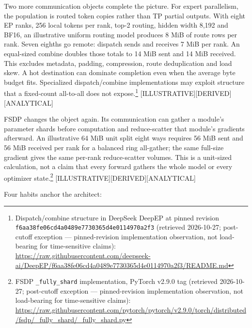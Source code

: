 Two more communication objects complete the picture. For expert
parallelism, the population is routed token copies rather than TP
partial outputs. With eight EP ranks, 256 local tokens per rank, top-2
routing, hidden width 8,192 and BF16, an illustrative uniform routing
model produces 8 MiB of route rows per rank. Seven eighths go remote:
dispatch sends and receives 7 MiB per rank. An equal-sized combine
doubles those totals to 14 MiB sent and 14 MiB received. This excludes
metadata, padding, compression, route deduplication and load skew. A hot
destination can dominate completion even when the average byte budget
fits. Specialized dispatch/combine implementations may exploit structure
that a fixed-count all-to-all does not expose.\footnote{Dispatch/combine
  structure in DeepSeek DeepEP at pinned revision
  \texttt{f6aa38fe06cd4a0489e7730365d4e0114970a2f3} (retrieved
  2026-10-27; post-cutoff exception --- pinned-revision implementation
  observation, not load-bearing for time-sensitive claims):
  \url{https://raw.githubusercontent.com/deepseek-ai/DeepEP/f6aa38fe06cd4a0489e7730365d4e0114970a2f3/README.md}}
\mbox{{[}ILLUSTRATIVE{]}}\hspace{0pt}\mbox{{[}DERIVED{]}}\hspace{0pt}\mbox{{[}ANALYTICAL{]}}

FSDP changes the object again. Its communication can gather a module's
parameter shards before computation and reduce-scatter that module's
gradients afterward. An illustrative 64 MiB unit split eight ways
requires 56 MiB sent and 56 MiB received per rank for a balanced ring
all-gather; the same full-size gradient gives the same per-rank
reduce-scatter volumes. This is a unit-sized calculation, not a claim
that every forward gathers the whole model or every optimizer
state.\footnote{FSDP \texttt{\_fully\_shard} implementation, PyTorch
  v2.9.0 tag (retrieved 2026-10-27; post-cutoff exception ---
  pinned-revision implementation observation, not load-bearing for
  time-sensitive claims):
  \url{https://raw.githubusercontent.com/pytorch/pytorch/v2.9.0/torch/distributed/fsdp/_fully_shard/_fully_shard.py}}
\mbox{{[}ILLUSTRATIVE{]}}\hspace{0pt}\mbox{{[}DERIVED{]}}\hspace{0pt}\mbox{{[}ANALYTICAL{]}}

\label{measurement}


Four habits anchor the architect:

